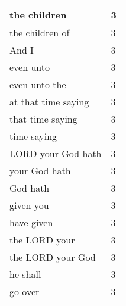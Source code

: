 \begin{center}
\begin{longtable}{|p{3.0in}|p{0.5in}|}
the children & 3\\ \hline 
the children of & 3\\ \hline 
And I & 3\\ \hline 
even unto & 3\\ \hline 
even unto the & 3\\ \hline 
at that time saying & 3\\ \hline 
that time saying & 3\\ \hline 
time saying & 3\\ \hline 
LORD your God hath & 3\\ \hline 
your God hath & 3\\ \hline 
God hath & 3\\ \hline 
given you & 3\\ \hline 
have given & 3\\ \hline 
the LORD your & 3\\ \hline 
the LORD your God & 3\\ \hline 
he shall & 3\\ \hline 
go over & 3\\ \hline 
\end{longtable}
\end{center}





